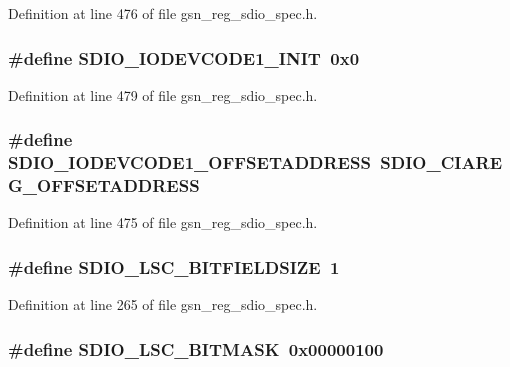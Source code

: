 Definition at line 476 of file gsn\_\-reg\_\-sdio\_\-spec.h.

\hypertarget{a00571_a99e78e386ce9eda01437bc8c7ee776b0}{
\subsubsection[{SDIO\_\-IODEVCODE1\_\-INIT}]{\setlength{\rightskip}{0pt plus 5cm}\#define SDIO\_\-IODEVCODE1\_\-INIT~0x0}}
\label{a00571_a99e78e386ce9eda01437bc8c7ee776b0}


Definition at line 479 of file gsn\_\-reg\_\-sdio\_\-spec.h.

\hypertarget{a00571_ad8188ea6d5eb3faf2a811f5237dff8f9}{
\subsubsection[{SDIO\_\-IODEVCODE1\_\-OFFSETADDRESS}]{\setlength{\rightskip}{0pt plus 5cm}\#define SDIO\_\-IODEVCODE1\_\-OFFSETADDRESS~SDIO\_\-CIAREG\_\-OFFSETADDRESS}}
\label{a00571_ad8188ea6d5eb3faf2a811f5237dff8f9}


Definition at line 475 of file gsn\_\-reg\_\-sdio\_\-spec.h.

\hypertarget{a00571_a54c15b2b76de1d922f77cdc2d3042661}{
\subsubsection[{SDIO\_\-LSC\_\-BITFIELDSIZE}]{\setlength{\rightskip}{0pt plus 5cm}\#define SDIO\_\-LSC\_\-BITFIELDSIZE~1}}
\label{a00571_a54c15b2b76de1d922f77cdc2d3042661}


Definition at line 265 of file gsn\_\-reg\_\-sdio\_\-spec.h.

\hypertarget{a00571_a9326a63fdbd8e0a75e4de4e0194da03f}{
\subsubsection[{SDIO\_\-LSC\_\-BITMASK}]{\setlength{\rightskip}{0pt plus 5cm}\#define SDIO\_\-LSC\_\-BITMASK~0x00000100}}
\label{a00571_a9326a63fdbd8e0a75e4de4e0194da03f}


